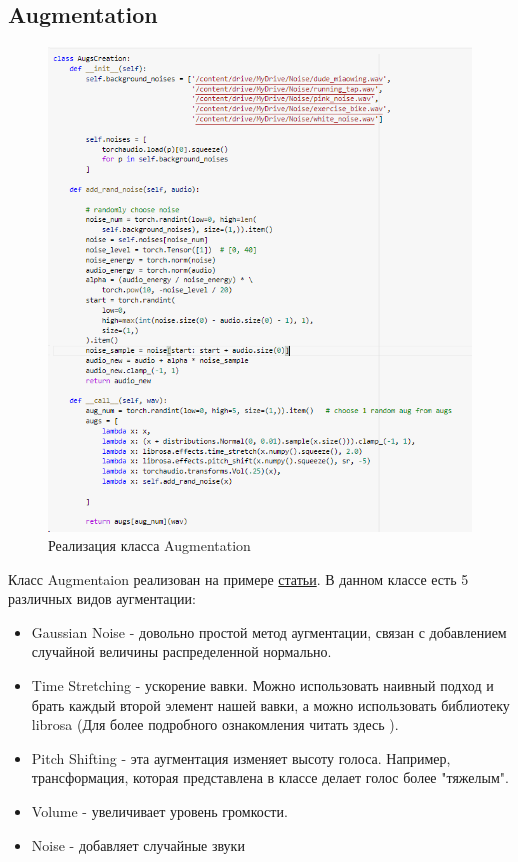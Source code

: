 \documentclass[a4paper,12pt]{article}
\begin{document}
 	\subsection{Augmentation}
		\begin{figure}[H]
			\centering
			\includegraphics[width=0.7\linewidth]{Image/Augmentation2}
			\caption{Реализация класса Augmentation}
			\label{fig:augmentation2}
		\end{figure}

 	 
 	 Класс Augmentaion реализован на примере \href{https://towardsdatascience.com/audio-deep-learning-made-simple-part-3-data-preparation-and-augmentation-24c6e1f6b52}{статьи}. В данном классе есть 5 различных видов аугментации: 
 	 
 	 \begin{itemize}
 	 	\item Gaussian Noise - довольно простой метод аугментации, связан с добавлением случайной величины распределенной нормально. 
 	 	\item Time Stretching - ускорение вавки. Можно использовать наивный подход и брать каждый второй элемент нашей вавки, а можно использовать библиотеку librosa (Для более подробного ознакомления читать здесь \cite{2}).
 	 	\item Pitch Shifting - эта аугментация изменяет высоту голоса. Например, трансформация, которая представлена в классе делает голос более "тяжелым".
 	 	\item Volume - увеличивает уровень громкости.
 	 	\item Noise - добавляет случайные звуки
 	 \end{itemize}
  	
\end{document}
